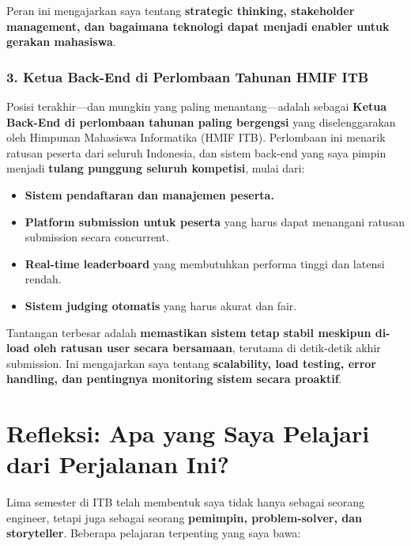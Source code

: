 \documentclass[
  letterpaper,
  DIV=11,
  numbers=noendperiod]{scrreprt}
\providecommand{\tightlist}{%
  \setlength{\itemsep}{0pt}\setlength{\parskip}{0pt}}
\begin{document}
Peran ini mengajarkan saya tentang \textbf{strategic thinking,
stakeholder management, dan bagaimana teknologi dapat menjadi enabler
untuk gerakan mahasiswa}.

\subsubsection{\texorpdfstring{\textbf{3. Ketua Back-End di Perlombaan
Tahunan HMIF
ITB}}{3. Ketua Back-End di Perlombaan Tahunan HMIF ITB}}\label{ketua-back-end-di-perlombaan-tahunan-hmif-itb}

Posisi terakhir---dan mungkin yang paling menantang---adalah sebagai
\textbf{Ketua Back-End di perlombaan tahunan paling bergengsi} yang
diselenggarakan oleh Himpunan Mahasiswa Informatika (HMIF ITB).
Perlombaan ini menarik ratusan peserta dari seluruh Indonesia, dan
sistem back-end yang saya pimpin menjadi \textbf{tulang punggung seluruh
kompetisi}, mulai dari:

\begin{itemize}
\tightlist
\item
  \textbf{Sistem pendaftaran dan manajemen peserta.}
\item
  \textbf{Platform submission untuk peserta} yang harus dapat menangani
  ratusan submission secara concurrent.
\item
  \textbf{Real-time leaderboard} yang membutuhkan performa tinggi dan
  latensi rendah.
\item
  \textbf{Sistem judging otomatis} yang harus akurat dan fair.
\end{itemize}

Tantangan terbesar adalah \textbf{memastikan sistem tetap stabil
meskipun di-load oleh ratusan user secara bersamaan}, terutama di
detik-detik akhir submission. Ini mengajarkan saya tentang
\textbf{scalability, load testing, error handling, dan pentingnya
monitoring sistem secara proaktif}.

\section{\texorpdfstring{\textbf{Refleksi: Apa yang Saya Pelajari dari
Perjalanan
Ini?}}{Refleksi: Apa yang Saya Pelajari dari Perjalanan Ini?}}\label{refleksi-apa-yang-saya-pelajari-dari-perjalanan-ini}

Lima semester di ITB telah membentuk saya tidak hanya sebagai seorang
engineer, tetapi juga sebagai seorang \textbf{pemimpin, problem-solver,
dan storyteller}. Beberapa pelajaran terpenting yang saya bawa:
\end{document}
